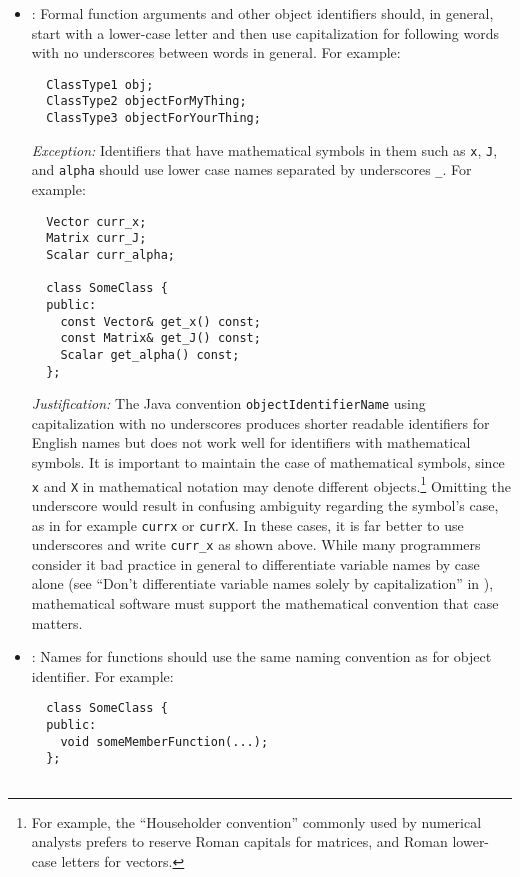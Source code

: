 \begin{itemize}
{}\item\NCObjectNames: Formal function arguments and other object identifiers
should, in general, start with a lower-case letter and then use capitalization
for following words with no underscores between words in general.  For
example:

{\small\begin{verbatim}
  ClassType1 obj;
  ClassType2 objectForMyThing;
  ClassType3 objectForYourThing;
\end{verbatim}}


{}\textit{Exception:} Identifiers that have mathematical symbols in
them such as {}\texttt{x}, {}\texttt{J}, and {}\texttt{alpha} should
use lower case names separated by underscores {}\texttt{\_}.  For
example:

{\small\begin{verbatim}
  Vector curr_x;
  Matrix curr_J;
  Scalar curr_alpha;

  class SomeClass {
  public:
    const Vector& get_x() const;
    const Matrix& get_J() const;
    Scalar get_alpha() const;
  };
\end{verbatim}}


\textit{Justification:} The Java convention
\texttt{objectIdentifierName} using capitalization with no underscores
produces shorter readable identifiers for English names but does not
work well for identifiers with mathematical symbols.  It is important
to maintain the case of mathematical symbols, since \texttt{x} and
\texttt{X} in mathematical notation may denote different
objects.\footnote{For example, the ``Householder convention'' commonly
  used by numerical analysts prefers to reserve Roman capitals for
  matrices, and Roman lower-case letters for vectors.}  Omitting the
underscore would result in confusing ambiguity regarding the symbol's
case, as in for example {}\texttt{currx} or {}\texttt{currX}.  In
these cases, it is far better to use underscores and write
\texttt{curr\_x} as shown above.  While many programmers consider it
bad practice in general to differentiate variable names by case alone
(see ``Don't differentiate variable names solely by capitalization''
in \cite[Section 11.7]{CodeComplete2nd04}), mathematical software must
support the mathematical convention that case matters.


\item\NCFunctionNames: Names for functions should use the same naming
  convention as for object identifier.  For example:

{\small\begin{verbatim}
  class SomeClass {
  public:
    void someMemberFunction(...);
  };


\end{verbatim}}
\end{itemize}
